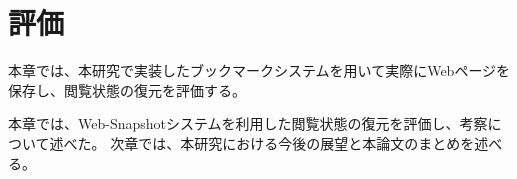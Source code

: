 \chapter{評価}
\label{chap:evaluation}
本章では、本研究で実装したブックマークシステムを用いて実際にWebページを保存し、閲覧状態の復元を評価する。






本章では、Web-Snapshotシステムを利用した閲覧状態の復元を評価し、考察について述べた。
次章では、本研究における今後の展望と本論文のまとめを述べる。